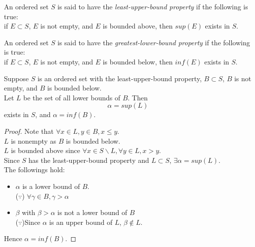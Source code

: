 \documentclass{report}
\begin{document}
		\begin{defn} \label{def_least_upper_bound_property}
			An ordered set $S$ is said to have the \emph{least-upper-bound property} if the following is true:\\
			if $E \subset S$, $E$ is not empty, and $E$ is bounded above, then $sup(E)$ exists in $S$.
		\end{defn}

		\begin{defn} \label{def_greatest_lower_bound_property}
			An ordered set $S$ is said to have the \emph{greatest-lower-bound property} if the following is true:\\
			if $E \subset S$, $E$ is not empty, and $E$ is bounded below, then $inf(E)$ exists in $S$.
		\end{defn}

		\begin{thm} \label{thm_glb_lub_property}
			Suppose $S$ is an ordered set with the least-upper-bound property, $B \subset S$, $B$ is not empty, and $B$ is bounded below.\\
			Let $L$ be the set of all lower bounds of $B$. Then
			\begin{displaymath}
				\alpha=sup(L)
			\end{displaymath}
			exists in $S$, and $\alpha=inf(B)$.
		\end{thm}

		\begin{proof}
			Note that $\forall x \in L, y \in B, x \leq y$.\\
			$L$ is nonempty as $B$ is bounded below.\\
			$L$ is bounded above since $\forall x \in S \backslash L, \forall y \in L, x>y$.\\
			Since $S$ has the least-upper-bound property and $L \subset S$, $\exists \alpha=sup(L)$.\\
			The followings hold:
			\begin{itemize}
				\item $\alpha$ is a lower bound of $B$.
					\\($\because$) $\forall \gamma \in B, \gamma > \alpha$
				\item $\beta$ with $\beta > \alpha$ is not a lower bound of $B$
					\\($\because$)Since $\alpha$ is an upper bound of $L$, $\beta \notin L$.
			\end{itemize}
			Hence $\alpha=inf(B)$.
		\end{proof}
		
\end{document}
